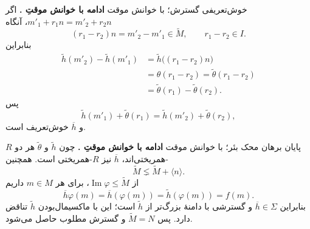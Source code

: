 \begin{frame}[t]{خوش‌تعریفی گسترش؛ با خوانش موقت}
\label{lec17:baer-well-defined}
\textbf{ادامه با خوانش موقتِ .}
اگر $m'_1+r_1n=m'_2+r_2n$، آنگاه
\[
(r_1-r_2)n=m'_2-m'_1\in\widetilde M,
\qquad r_1-r_2\in I.
\]
بنابراین
\[
\begin{aligned}
\widetilde h(m'_2)-\widetilde h(m'_1)
&=\widetilde h\bigl((r_1-r_2)n\bigr)\\
&=\theta(r_1-r_2)=\widetilde\theta(r_1-r_2)\\
&=\widetilde\theta(r_1)-\widetilde\theta(r_2).
\end{aligned}
\]
پس
\[
\widetilde h(m'_1)+\widetilde\theta(r_1)
=\widetilde h(m'_2)+\widetilde\theta(r_2),
\]
و $\overline h$ خوش‌تعریف است.
\end{frame}

\begin{frame}[t]{پایان برهان محک بئر؛ با خوانش موقت}
\label{lec17:baer-maximality-contradiction}
\textbf{ادامه با خوانش موقتِ .}
چون $\widetilde h$ و $\widetilde\theta$ هر دو $R$-همریختی‌اند،
$\overline h$ نیز $R$-همریختی است. همچنین
\[
\widetilde M\lneq\widetilde M+\langle n\rangle.
\]
از $\operatorname{Im}\varphi\le\widetilde M$، برای هر $m\in M$ داریم
\[
\overline h\varphi(m)
=\overline h(\varphi(m))
=\widetilde h(\varphi(m))=f(m).
\]
بنابراین $\overline h\in\Sigma$ و گسترشی با دامنهٔ بزرگ‌تر از
$\widetilde h$ است؛ این با ماکسیمال‌بودن $\widetilde h$ تناقض دارد.
پس $\widetilde M=N$ و گسترش مطلوب حاصل می‌شود.
\end{frame}
